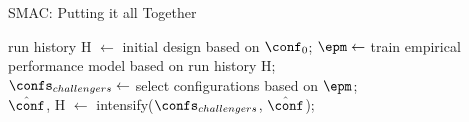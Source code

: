 \begin{frame}[c]{SMAC: Putting it all Together}

\LinesNotNumbered
\begin{algorithm}[H]
\BlankLine
run history H $\leftarrow$ initial design based on $\conf_0$; 
 {
   	\pause
	$\epm \leftarrow$ train empirical performance model based on run history H;\\
	\pause
	$\confs_{challengers} \leftarrow$ select configurations based on $\epm$;\\
	\pause
	$\hat{\conf}$, H $\leftarrow$ intensify($\confs_{challengers}$, $\hat{\conf}$);
}
\pause
\Return{$\hat{\conf}$}
\caption{SMAC}
\end{algorithm}

\end{frame}

